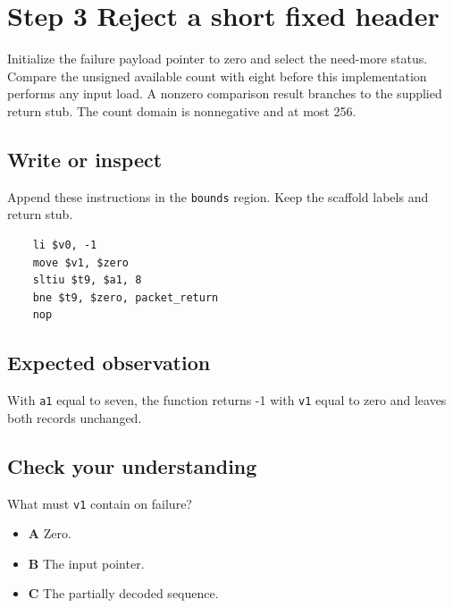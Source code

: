 \section{Step 3 Reject a short fixed header}\label{packet-s03}

Initialize the failure payload pointer to zero and select the need-more status. Compare the unsigned available count with eight before this implementation performs any input load. A nonzero comparison result branches to the supplied return stub. The count domain is nonnegative and at most 256.

\subsection{Write or inspect}
Append these instructions in the \texttt{bounds} region. Keep the scaffold labels and return stub.

\begin{verbatim}
    li $v0, -1
    move $v1, $zero
    sltiu $t9, $a1, 8
    bne $t9, $zero, packet_return
    nop
\end{verbatim}

\subsection{Expected observation}
With \texttt{a1} equal to seven, the function returns -1 with \texttt{v1} equal to zero and leaves both records unchanged.

\subsection{Check your understanding}
What must \texttt{v1} contain on failure?

\begin{itemize}
  \item \textbf{A} Zero.
  \item \textbf{B} The input pointer.
  \item \textbf{C} The partially decoded sequence.
\end{itemize}
